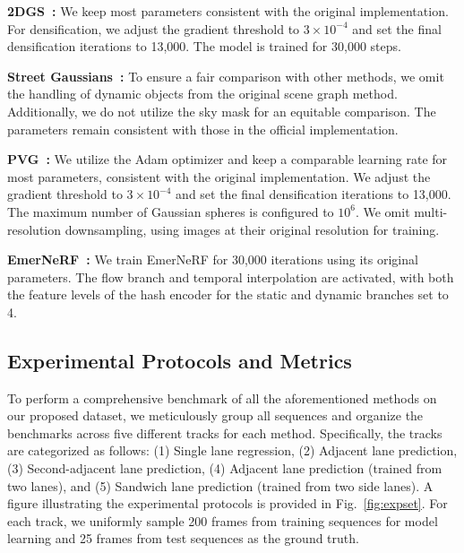 \textbf{2DGS~\cite{Huang20242DGS}:} 
We keep most parameters consistent with the original implementation. For densification, we adjust the gradient threshold to \(3 \times 10^{-4}\) and set the final densification iterations to 13,000. The model is trained for 30,000 steps.

\textbf{Street Gaussians~\cite{yan2024street}:} To ensure a fair comparison with other methods, we omit the handling of dynamic objects from the original scene graph method. Additionally, we do not utilize the sky mask for an equitable comparison. The parameters remain consistent with those in the official implementation.

\textbf{PVG~\cite{chen2023pvg}:} 
We utilize the Adam optimizer and keep a comparable learning rate for most parameters, consistent with the original implementation. We adjust the gradient threshold to \(3 \times 10^{-4}\) and set the final densification iterations to 13,000. The maximum number of Gaussian spheres is configured to \(10^{6}\). {We omit multi-resolution downsampling, using images at their original resolution for training.}

\textbf{EmerNeRF~\cite{yang2023emernerf}:} 
We train EmerNeRF for 30,000 iterations using its original parameters. The flow branch and temporal interpolation are activated, with both the feature levels of the hash encoder for the static and dynamic branches set to 4.

\subsection{Experimental Protocols and Metrics}
\label{sec:bench:design}


To perform a comprehensive benchmark of all the aforementioned methods on our proposed dataset, we meticulously group all sequences and organize the benchmarks across five different tracks for each method. Specifically, the tracks are categorized as follows: (1) Single lane regression, (2) Adjacent lane prediction, (3) Second-adjacent lane prediction, (4) Adjacent lane prediction (trained from two lanes), and (5) Sandwich lane prediction (trained from two side lanes). A figure illustrating the experimental protocols is provided in Fig.~\ref{fig:expset}. For each track, we uniformly sample 200 frames from training sequences for model learning and 25 frames from test sequences as the ground truth.

